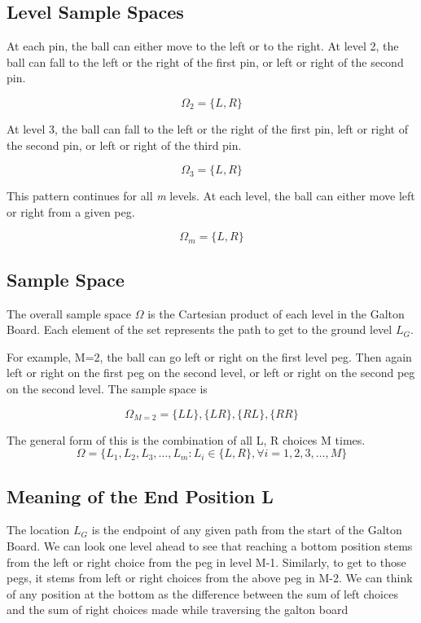 \documentclass{article}
\begin{document}
\subsection{Level Sample Spaces}
At each pin, the ball can either move to the left or to the right. At level 2, the ball can fall to the left or the right of the first pin, or left or right of the second pin.

\[\Omega_2 = \{L,R\}\]

\noindent
At level 3, the ball can fall to the left or the right of the first pin, left or right of the second pin, or left or right of the third pin.

\[\Omega_3 = \{L,R\}\]

\noindent
This pattern continues for all \textit{m} levels. At each level, the ball can either move left or right from a given peg.

\[\Omega_m = \{L,R\}\]

\subsection{Sample Space}
The overall sample space $\Omega$ is the Cartesian product of each level in the Galton Board. Each element of the set represents the path to get to the ground level $L_G$. 

\noindent
For example, M=2, the ball can go left or right on the first level peg. Then again left or right on the first peg on the second level, or left or right on the second peg on the second level. The sample space is 

\[\Omega_{M=2} = \{LL\}, \{LR\}, \{RL\}, \{RR\} \]

\noindent
The general form of this is the combination of all L, R choices M times.
\[\Omega = \{L_1, L_2, L_3, \dots,L_m : L_i \in \{L,R\}, \forall i = 1, 2, 3, \dots, M\}\]

\subsection{Meaning of the End Position L}

The location $L_G$ is the endpoint of any given path from the start of the Galton Board. We can look one level ahead to see that reaching a bottom position stems from the left or right choice from the peg in level M-1. Similarly, to get to those pegs, it stems from left or right choices from the above peg in M-2. We can think of any position at the bottom as the difference between the sum of left choices and the sum of right choices made while traversing the galton board
\end{document}
